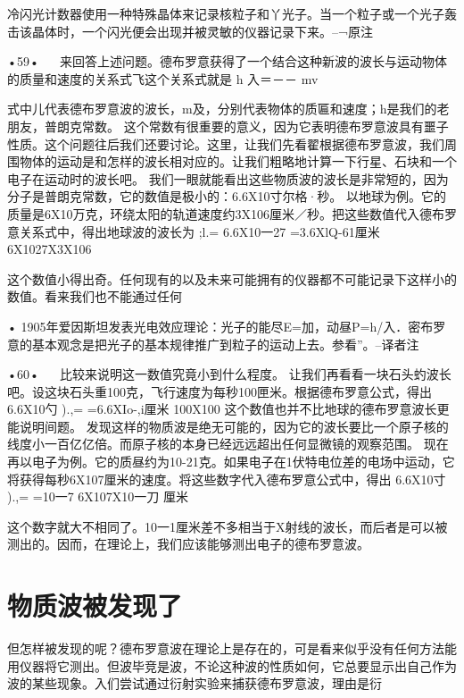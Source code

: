 冷闪光计数器使用一种特殊晶体来记录核粒子和丫光子。当一个粒子或一个光子轰击该晶体时，一个闪光便会出现并被灵敏的仪器记录下来。--¬原注

•59•
  
来回答上述问题。德布罗意获得了一个结合这种新波的波长与运动物体的质量和速度的关系式飞这个关系式就是
h
入＝－－
mv

式中儿代表德布罗意波的波长，m及，分别代表物体的质匾和速度；h是我们的老朋友，普朗克常数。
这个常数有很重要的意义，因为它表明德布罗意波具有噩子性质。这个问题往后我们还要讨论。这里，让我们先看翟根据德布罗意波，我们周围物体的运动是和怎样的波长相对应的。让我们粗略地计算一下行星、石块和一个电子在运动时的波长吧。
我们一眼就能看出这些物质波的波长是非常短的，因为分子是普朗克常数，它的数值是极小的：6.6X10寸尔格·秒。
以地球为例。它的质量是6X10万克，环绕太阳的轨道速度约3X106厘米／秒。把这些数值代入德布罗意关系式中，得出地球波的波长为
;l.=
6.6X10一27
=3.6XlQ-61厘米6X1027X3X106

这个数值小得出奇。任何现有的以及未来可能拥有的仪器都不可能记录下这样小的数值。看来我们也不能通过任何

•	1905年爱因斯坦发表光电效应理论：光子的能尽E=加，动昼P=h/入．密布罗意的基本观念是把光子的基本规律推广到粒子的运动上去。参看”。--译者注

•60•
  
比较来说明这一数值究竟小到什么程度。
让我们再看看一块石头虳波长吧。设这块石头重100克，飞行速度为每秒100匣米。根据德布罗意公式，得出
6.6X10勺
	).,=	=6.6XIo-,i厘米
100X100
这个数值也并不比地球的德布罗意波长更能说明间题。
发现这样的物质波是绝无可能的，因为它的波长要比一个原子核的线度小一百亿亿倍。而原子核的本身已经远远超出任何显微镜的观察范围。
现在再以电子为例。它的质昼约为10-21克。如果电子在1伏特电位差的电场中运动，它将获得每秒6X107厘米的速度。将这些数字代入德布罗意公式中，得出
6.6X10寸
	).,=	=10一7
6X107X10一刀
厘米

这个数字就大不相同了。10一1厘米差不多相当于X射线的波长，而后者是可以被测出的。因而，在理论上，我们应该能够测出电子的德布罗意波。

\section{物质波被发现了}

但怎样被发现的呢？德布罗意波在理论上是存在的，可是看来似乎没有任何方法能用仪器将它测出。但波毕竞是波，不论这种波的性质如何，它总要显示出自己作为波的某些现象。入们尝试通过衍射实验来捕获德布罗意波，理由是衍

